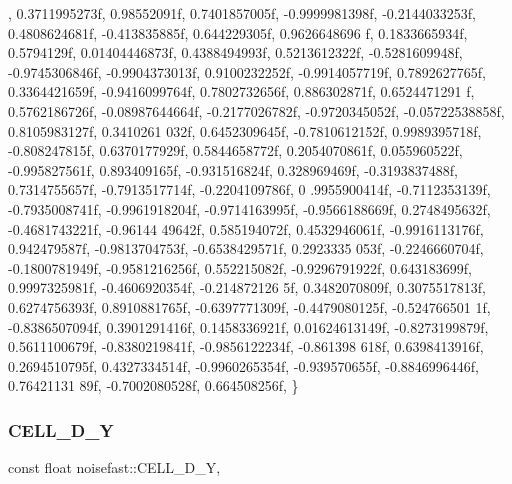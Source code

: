 \begin{DoxyCode}
      , 0.3711995273f, 0.98552091f,
    0.7401857005f, -0.9999981398f, -0.2144033253f, 0.4808624681f, -0.413835885f, 0.644229305f, 0.9626648696
      f, 0.1833665934f, 0.5794129f, 0.01404446873f, 0.4388494993f, 0.5213612322f, -0.5281609948f, -0.9745306846f, 
      -0.9904373013f, 0.9100232252f,
    -0.9914057719f, 0.7892627765f, 0.3364421659f, -0.9416099764f, 0.7802732656f, 0.886302871f, 0.6524471291
      f, 0.5762186726f, -0.08987644664f, -0.2177026782f, -0.9720345052f, -0.05722538858f, 0.8105983127f, 0.3410261
      032f, 0.6452309645f, -0.7810612152f,
    0.9989395718f, -0.808247815f, 0.6370177929f, 0.5844658772f, 0.2054070861f, 0.055960522f, -0.995827561f,
       0.893409165f, -0.931516824f, 0.328969469f, -0.3193837488f, 0.7314755657f, -0.7913517714f, -0.2204109786f, 0
      .9955900414f, -0.7112353139f,
    -0.7935008741f, -0.9961918204f, -0.9714163995f, -0.9566188669f, 0.2748495632f, -0.4681743221f, -0.96144
      49642f, 0.585194072f, 0.4532946061f, -0.9916113176f, 0.942479587f, -0.9813704753f, -0.6538429571f, 0.2923335
      053f, -0.2246660704f, -0.1800781949f,
    -0.9581216256f, 0.552215082f, -0.9296791922f, 0.643183699f, 0.9997325981f, -0.4606920354f, -0.214872126
      5f, 0.3482070809f, 0.3075517813f, 0.6274756393f, 0.8910881765f, -0.6397771309f, -0.4479080125f, -0.524766501
      1f, -0.8386507094f, 0.3901291416f,
    0.1458336921f, 0.01624613149f, -0.8273199879f, 0.5611100679f, -0.8380219841f, -0.9856122234f, -0.861398
      618f, 0.6398413916f, 0.2694510795f, 0.4327334514f, -0.9960265354f, -0.939570655f, -0.8846996446f, 0.76421131
      89f, -0.7002080528f, 0.664508256f,
\}
\end{DoxyCode}
\mbox{\label{classnoisefast_a3e9a184638b7beb67658ab67e0dfcaae}} 
\subsubsection{\texorpdfstring{C\+E\+L\+L\+\_\+D\+\_\+Y}{CELL\_2D\_Y}}
{\footnotesize\ttfamily const float noisefast\+::\+C\+E\+L\+L\+\_\+D\+\_\+Y\hspace{0.3cm}{\ttfamily [static]}, {\ttfamily [private]}}


